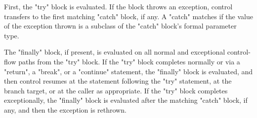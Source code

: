 First, the \xcd"try" block is evaluated.  If the block throws an
exception, control transfers to the first matching \xcd"catch"
block, if any.  A \xcd"catch" matches if the value of the
exception thrown is a subclass of the \xcd"catch" block's formal
parameter type.

The \xcd"finally" block, if present, is evaluated on all normal
and exceptional control-flow paths from the \xcd"try" block.
If the \xcd"try" block completes normally
or via a \xcd"return", a \xcd"break", or a
\xcd"continue" statement, 
the \xcd"finally"
block is evaluated, and then control resumes at
the statement following the \xcd"try" statement, at the branch target, or at
the caller as appropriate.
If the \xcd"try" block completes
exceptionally, the \xcd"finally" block is evaluated after the
matching \xcd"catch" block, if any, and then the
exception is rethrown.




